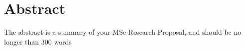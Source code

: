 \chapter{Abstract}
The abstract is a summary of your MSc Research Proposal, and should be no longer than 300 words